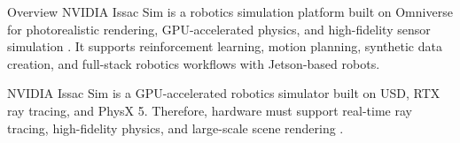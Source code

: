 %
%
%

\begin{frame}{Overview}
NVIDIA Issac Sim is a robotics simulation platform built on Omniverse for 
photorealistic rendering, GPU-accelerated physics, and high-fidelity sensor simulation 
\cite{NVIDIA:2022}.  
It supports reinforcement learning, motion planning, synthetic data creation, and full-stack 
robotics workflows with Jetson-based robots.  
\end{frame}

{
NVIDIA Issac Sim is a GPU-accelerated robotics simulator built on USD, RTX ray tracing,
and PhysX 5. Therefore, hardware must support real-time ray tracing, high-fidelity physics,
and large-scale scene rendering \cite{HWReq:2024}.
}

